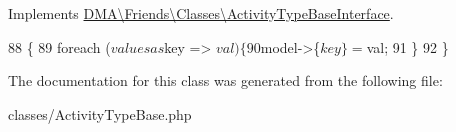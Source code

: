 Implements \hyperlink{interfaceDMA_1_1Friends_1_1Classes_1_1ActivityTypeBaseInterface}{D\+M\+A\textbackslash{}\+Friends\textbackslash{}\+Classes\textbackslash{}\+Activity\+Type\+Base\+Interface}.


\begin{DoxyCode}
88                                               \{
89         \textcolor{keywordflow}{foreach} ($values as $key => $val) \{
90             $model->\{$key\} = $val;
91         \}
92     \}
\end{DoxyCode}


The documentation for this class was generated from the following file\+:\begin{DoxyCompactItemize}
\item 
classes/Activity\+Type\+Base.\+php\end{DoxyCompactItemize}
